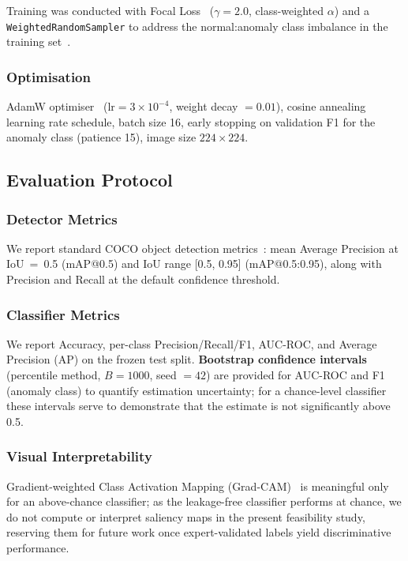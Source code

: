 \documentclass[journal=animals,article=article,submit=mdpi,moreauthors=true,pdftex]{mdpi}
\begin{document}
Training was conducted with Focal Loss~\cite{lin2017focal}
($\gamma = 2.0$, class-weighted $\alpha$) and a \texttt{WeightedRandomSampler} to
address the normal:anomaly class imbalance in the training set~\cite{chawla2002}.

\subsubsection{Optimisation}

AdamW optimiser~\cite{loshchilov2019} ($\mathrm{lr} = 3 \times 10^{-4}$,
weight decay $= 0.01$), cosine annealing learning rate schedule, batch size 16,
early stopping on validation F1 for the anomaly class (patience 15),
image size $224 \times 224$.

\subsection{Evaluation Protocol}
\label{sec:eval}

\subsubsection{Detector Metrics}

We report standard COCO object detection metrics~\cite{lin2014coco,russakovsky2015}:
mean Average Precision at IoU~=~0.5 (mAP@0.5) and IoU range [0.5, 0.95]
(mAP@0.5:0.95), along with Precision and Recall at the default confidence threshold.

\subsubsection{Classifier Metrics}

We report Accuracy, per-class Precision/Recall/F1, AUC-ROC, and
Average Precision (AP) on the frozen test split.
\textbf{Bootstrap confidence intervals}~\cite{efron1994} (percentile method,
$B = 1000$, seed $= 42$) are provided for AUC-ROC and F1 (anomaly class) to
quantify estimation uncertainty; for a chance-level classifier these intervals serve to
demonstrate that the estimate is not significantly above 0.5.

\subsubsection{Visual Interpretability}

Gradient-weighted Class Activation Mapping (Grad-CAM)~\cite{selvaraju2017,chattopadhay2018}
is meaningful only for an above-chance classifier; as the leakage-free classifier performs
at chance, we do not compute or interpret saliency maps in the present feasibility study,
reserving them for future work once expert-validated labels yield discriminative
performance.
\end{document}
